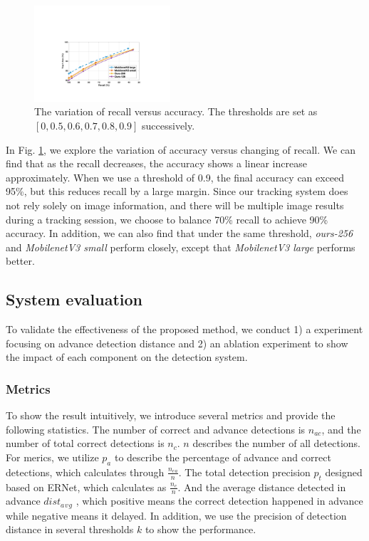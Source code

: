\documentclass[journal]{IEEEtran}
\begin{document}
\begin{figure}[htbp]
    \centerline{\includegraphics[width=0.45\textwidth]{fig/recall_dec.pdf}}
    \caption{The variation of recall versus accuracy. The thresholds are set as $[0, 0.5, 0.6, 0.7, 0.8, 0.9 ] $ successively.}
    \label{fig:recall_dec}
\end{figure}

In Fig. \ref{fig:recall_dec}, we explore the variation of accuracy versus changing of recall. We can find that as the recall decreases, the accuracy shows a linear increase approximately. When we use a threshold of 0.9, the final accuracy can exceed 95\%, but this reduces recall by a large margin. Since our tracking system does not rely solely on image information, and there will be multiple image results during a tracking session, we choose to balance 70\% recall to achieve 90\% accuracy.
In addition, we can also find that under the same threshold, \textit{ours-256} and \textit{MobilenetV3 small} perform closely, except that \textit{MobilenetV3 large} performs better.

\subsection{System evaluation}
To validate the effectiveness of the proposed method, we conduct 1) a experiment focusing on advance detection distance and 2) an ablation experiment to show the impact of each component on the detection system.
\subsubsection{Metrics}
To show the result intuitively, we introduce several metrics and provide the following statistics. The number of correct and advance detections is $n_{ac}$, and the number of total correct detections is $n_c$. $n$ describes the number of all detections.
For merics, we utilize $p_a$ to describe the percentage of advance and correct detections, which calculates through $\frac{n_c{}_a}{n}$. The total detection precision $p_t$ designed based on ERNet\cite{zhang2020elevated}, which calculates as $\frac{n_c}{n}$. And the average distance detected in advance $dist_a{}_v{}_g$ , which positive means the correct detection happened in advance while negative means it delayed. In addition, we use the precision of detection distance in several thresholds $k$ to show the performance.
\end{document}
